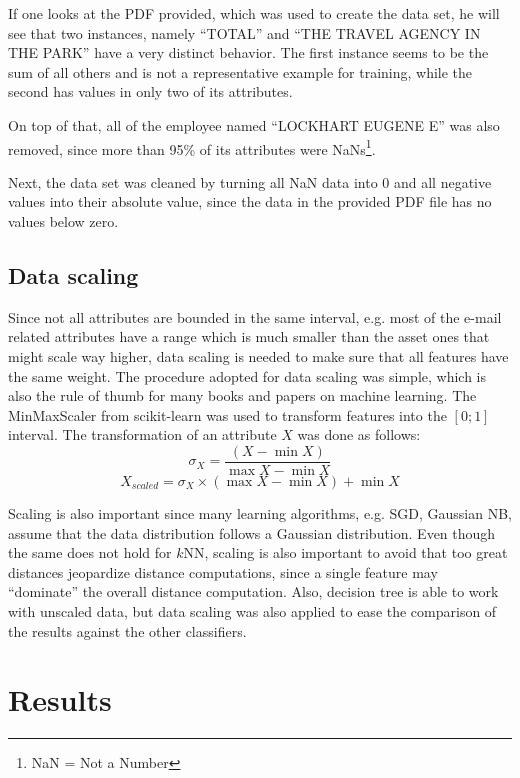 \documentclass[11pt]{article}
\begin{document}
		If one looks at the PDF provided, which was used to create the data set, he will see that two instances, namely ``TOTAL'' and ``THE TRAVEL AGENCY IN THE PARK'' have a very distinct behavior.
		The first instance seems to be the sum of all others and is not a representative example for training, while the second has values in only two of its attributes.
	
		On top of that, all of the employee named ``LOCKHART EUGENE E'' was also removed, since more than 95\% of its attributes were NaNs\footnote{NaN = Not a Number}.
		
		Next, the data set was cleaned by turning all NaN data into $0$ and all negative values into their absolute value, since the data in the provided PDF file has no values below zero.
	
	\subsection{Data scaling}

		Since not all attributes are bounded in the same interval, e.g. most of the e-mail related attributes have a range which is much smaller than the asset ones that might scale way higher, data scaling is needed to make sure that all features have the same weight.
		The procedure adopted for data scaling was simple, which is also the rule of thumb for many books and papers on machine learning.
		The MinMaxScaler from scikit-learn was used to transform features into the $[0;1]$ interval.
		The transformation of an attribute $X$ was done as follows:
		\begin{displaymath}
			\sigma_X = \frac{(X - \min{X})}{\max{X} - \min{X}}
		\end{displaymath}
		\begin{displaymath}
			X_{scaled} = \sigma_X \times (\max{X} - \min{X}) + \min{X}
		\end{displaymath}
		
		Scaling is also important since many learning algorithms, e.g. SGD, Gaussian NB, assume that the data distribution follows a Gaussian distribution.
		Even though the same does not hold for $k$NN, scaling is also important to avoid that too great distances jeopardize distance computations, since a single feature may ``dominate'' the overall distance computation.
		Also, decision tree is able to work with unscaled data, but data scaling was also applied to ease the comparison of the results against the other classifiers.		
		
\section{Results} \label{sec:results}
\end{document}
